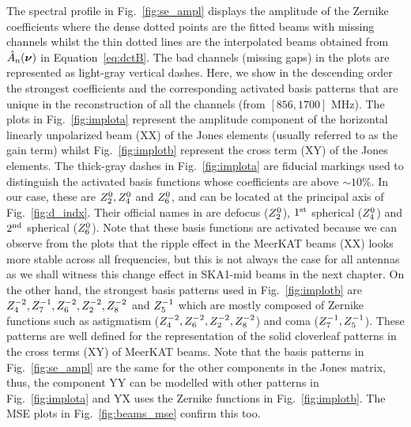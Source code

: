 The spectral profile in Fig.~\ref{fig:se_ampl} displays the amplitude of the Zernike coefficients where the dense dotted points are the fitted beams with missing channels whilst
the thin dotted lines are the interpolated beams obtained from $\hat{A}_{\rm n}(\boldsymbol{\nu})$ in Equation~\ref{eq:dctB}. The bad channels (missing gaps) in the plots are represented 
as light-gray vertical dashes. Here, we show in the descending order the strongest coefficients and the corresponding activated basis patterns that are unique in the reconstruction 
of all the channels (from $[856,1700]$ MHz). The plots in Fig.~\ref{fig:implota} represent the amplitude component of the horizontal linearly unpolarized beam (XX) of the Jones 
elements (usually referred to as the gain term) whilst Fig.~\ref{fig:implotb} represent the cross term (XY) of the Jones elements. The thick-gray dashes in Fig.~\ref{fig:implota}
are fiducial markings used to distinguish the activated basis functions whose coefficients are above $\sim 10 \%$. In our case, these are 
$Z_{\rm 2}^{0}, Z_{\rm 4}^{0}$ and  $Z_{\rm 6}^{0}$, and can be located at the principal axis of Fig.~\ref{fig:d_indx}. Their official names 
in \cite{lakshminarayanan2011zernike} are defocus ($Z_{\rm 2}^{0}$), $\rm 1^{st}$ spherical ($Z_{\rm 4}^{0}$) and $\rm 2^{nd}$ spherical ($Z_{\rm 6}^{0}$). Note that these 
basis functions are activated because we can observe from the plots that the ripple effect in the MeerKAT beams (XX) looks more stable across all frequencies, but this is 
not always the case for all antennas as we shall witness this change effect in SKA1-mid beams in the next chapter. On the other hand, the strongest basis patterns used in 
Fig.~\ref{fig:implotb} are $Z_{\rm 4}^{-2}, Z_{\rm 7}^{-1}, Z_{\rm 6}^{-2}, Z_{\rm 2}^{-2}, Z_{\rm 8}^{-2}$ and $Z_{\rm 5}^{-1}$ which are mostly 
composed of Zernike functions such as astigmatism ($Z_{\rm 4}^{-2}, Z_{\rm 6}^{-2}, Z_{\rm 2}^{-2}, Z_{\rm 8}^{-2}$) and coma ($Z_{\rm 7}^{-1}, Z_{\rm 5}^{-1}$). These patterns
are well defined for the representation of the solid cloverleaf patterns in the cross terms (XY) of MeerKAT beams. Note that the basis patterns in Fig.~\ref{fig:se_ampl} are the
same for the other components in the Jones matrix, thus, the component YY can be modelled with other patterns in Fig.~\ref{fig:implota} and YX uses the Zernike functions in 
Fig.~\ref{fig:implotb}. The MSE plots in Fig.~\ref{fig:beams_mse} confirm this too.

